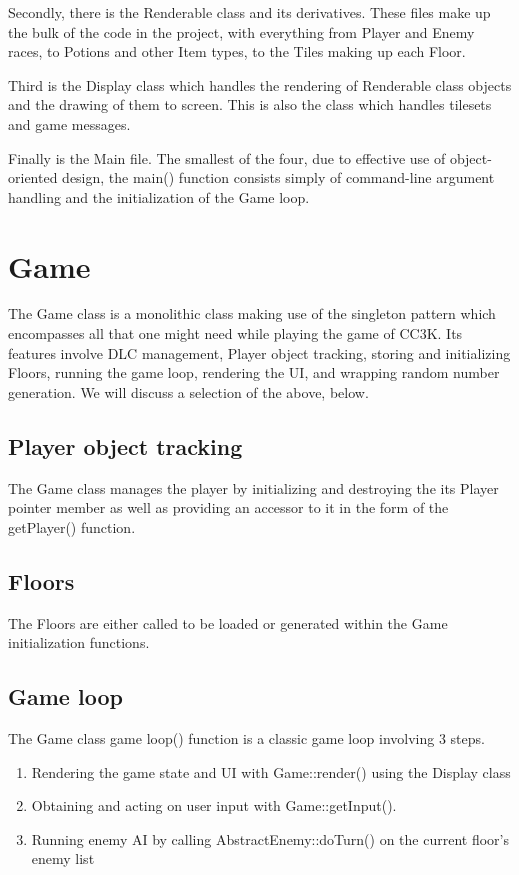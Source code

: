 \documentclass{article}
\begin{document}
Secondly, there is the Renderable class and its derivatives. These files make up the bulk of the code in the project, with everything from Player and Enemy races, to Potions and other Item types, to the Tiles making up each Floor.

Third is the Display class which handles the rendering of Renderable class objects and the drawing of them to screen. This is also the class which handles tilesets and game messages.

Finally is the Main file. The smallest of the four, due to effective use of object-oriented design, the main() function consists simply of command-line argument handling and the initialization of the Game loop.

\section{Game}

The Game class is a monolithic class making use of the singleton pattern which encompasses all that one might need while playing the game of CC3K. Its features involve DLC management, Player object tracking, storing and initializing Floors, running the game loop, rendering the UI, and wrapping random number generation. We will discuss a selection of the above, below.

\subsection{Player object tracking}

The Game class manages the player by initializing and destroying the its Player pointer member as well as providing an accessor to it in the form of the getPlayer() function.

\subsection{Floors}

The Floors are either called to be loaded or generated within the Game initialization functions.

\subsection{Game loop}

The Game class game loop() function is a classic game loop involving 3 steps.

\begin{enumerate}
\item Rendering the game state and UI with Game::render() using the Display class
\item Obtaining and acting on user input with Game::getInput().
\item Running enemy AI by calling AbstractEnemy::doTurn() on the current floor's enemy list
\end{enumerate}
\end{document}
